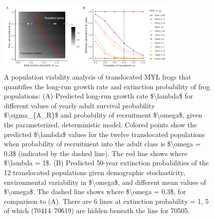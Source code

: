 \documentclass[9pt,twocolumn,twoside,lineno]{pnas-new}
\begin{document}
\begin{figure}

{\centering \includegraphics[width=0.8\textwidth]{figures/pop_viability_figures_for_manuscript.jpg}

}

\caption{\label{fig-viability}A population viability analysis of
translocated MYL frogs that quantifies the long-run growth rate and
extinction probability of frog populations: (A) Predicted long-run
growth rate \$\textbackslash lambda\$ for different values of yearly
adult survival probability \$\textbackslash sigma\_\{A\_R\}\$ and
probability of recruitment \$\textbackslash omega\$, given the
parameterized, deterministic model. Colored points show the predicted
\$\textbackslash lambda\$ values for the twelve translocated populations
when probability of recruitment into the adult class is
\$\textbackslash omega = 0.3\$ (indicated by the dashed line). The red
line shows where \$\textbackslash lambda = 1\$. (B) Predicted 50-year
extinction probabilities of the 12 translocated populations given
demographic stochasticity, environmental variability in
\$\textbackslash omega\$, and different mean values of
\$\textbackslash omega\$. The dashed line shows where
\$\textbackslash omega = 0.3\$, for comparison to (A). There are 6 lines
at extinction probability = 1, 5 of which (70414--70619) are hidden
beneath the line for 70505.}

\end{figure}

\newpage
\end{document}
